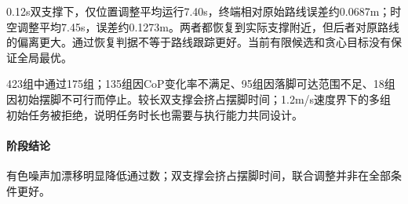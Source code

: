 0.12s双支撑下，仅位置调整平均运行7.40s，终端相对原始路线误差约0.0687m；时空调整平均7.45s，误差约0.1273m。两者都恢复到实际支撑附近，但后者对原路线的偏离更大。通过恢复判据不等于路线跟踪更好。当前有限候选和贪心目标没有保证全局最优。

423组中通过175组；135组因CoP变化率不满足、95组因落脚可达范围不足、18组因初始摆脚不可行而停止。较长双支撑会挤占摆脚时间；1.2m/s速度界下的多组初始任务被拒绝，说明任务时长也需要与执行能力共同设计。


\paragraph{阶段结论}有色噪声加漂移明显降低通过数；双支撑会挤占摆脚时间，联合调整并非在全部条件更好。


\FloatBarrier
